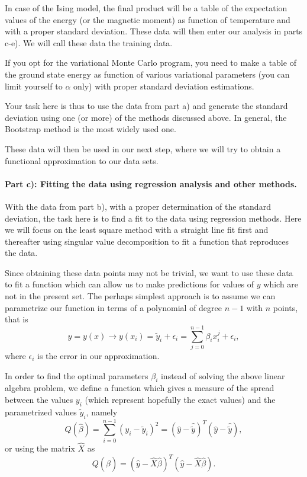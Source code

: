 \documentclass[%
oneside,                 %
final,                   %
10pt]{article}
\begin{document}
In case of the Ising model, the final product will be a table of the expectation values of the energy (or the magnetic moment) as function of temperature and with a proper standard deviation. These data will then enter our analysis in parts c-e). We will call these data the training data. 

If you opt for the variational Monte Carlo program, you need to make a table of the ground state energy as function of various variational parameters (you can limit yourself to $\alpha$ only) with proper standard deviation estimations.

Your task here is thus to use the data from part a) and generate the standard deviation using one (or more) of the methods discussed above. In general, the Bootstrap method is the most widely used one. 

These data will then be used in our next step, where we will try to obtain a functional approximation to our data sets. 

\paragraph{Part c): Fitting the data using regression analysis and other methods.}
With the data from part b), with a proper determination of the standard deviation, the task here is to find a fit to the data using regression methods. Here we will focus on the least square method with a straight line fit first and thereafter using singular value decomposition to fit a function that reproduces the data.

Since obtaining these data points may not be trivial, we want to use these data to fit a function which can allow us to make predictions for values of $y$ which are not in the present set. The perhaps simplest approach is to assume we can parametrize our function in terms of a polynomial of degree $n-1$ with $n$ points, that is
\[
y=y(x) \rightarrow y(x_i)=\tilde{y}_i+\epsilon_i=\sum_{j=0}^{n-1} \beta_i x_i^j+\epsilon_i,
\]
where $\epsilon_i$ is the error in our approximation. 

In order to find the optimal parameters $\beta_i$ instead of solving the above linear algebra problem, we define a function which gives a measure of the spread between the values $y_i$ (which represent hopefully the exact values) and the parametrized values $\tilde{y}_i$, namely
\[
Q(\hat{\beta})=\sum_{i=0}^{n-1}\left(y_i-\tilde{y}_i\right)^2=\left(\hat{y}-\hat{\tilde{y}}\right)^T\left(\hat{y}-\hat{\tilde{y}}\right),
\]
or using the matrix $\hat{X}$ as
\[
Q(\hat{\beta})=\left(\hat{y}-\hat{X}\hat{\beta}\right)^T\left(\hat{y}-\hat{X}\hat{\beta}\right).
\]
\end{document}
